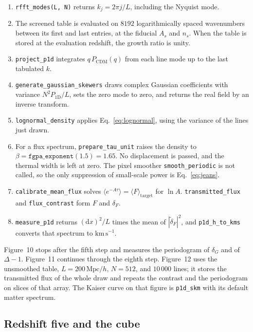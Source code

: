 \documentclass[11pt]{article}
\begin{document}
\begin{enumerate}
\item \texttt{rfft\_modes(L, N)} returns $k_j=2\pi j/L$, including the Nyquist mode.
\item The screened table is evaluated on $8192$ logarithmically spaced wavenumbers between its first and last entries, at the fiducial $A_s$ and $n_s$.
When the table is stored at the evaluation redshift, the growth ratio is unity.
\item \texttt{project\_p1d} integrates $q\,P_\mathrm{CDM}(q)$ from each line mode up to the last tabulated $k$.
\item \texttt{generate\_gaussian\_skewers} draws complex Gaussian coefficients with variance $N^{2}P_{1\mathrm{D}}/L$, sets the zero mode to zero, and returns the real field by an inverse transform.
\item \texttt{lognormal\_density} applies Eq.~\eqref{eq:lognormal}, using the variance of the lines just drawn.
\item For a flux spectrum, \texttt{prepare\_tau\_unit} raises the density to $\beta=\texttt{fgpa\_exponent}(1.5)=1.65$.
No displacement is passed, and the thermal width is left at zero.
The pixel smoother \texttt{smooth\_periodic} is not called, so the only suppression of small-scale power is Eq.~\eqref{eq:jeans}.
\item \texttt{calibrate\_mean\_flux} solves $\langle e^{-A\tau}\rangle=\langle F\rangle_\mathrm{target}$ for $\ln A$.
\texttt{transmitted\_flux} and \texttt{flux\_contrast} form $F$ and $\delta_F$.
\item \texttt{measure\_p1d} returns $(\mathrm{d}x)^{2}/L$ times the mean of $|\tilde\delta_F|^{2}$, and \texttt{p1d\_h\_to\_kms} converts that spectrum to $\mathrm{km\,s}^{-1}$.
\end{enumerate}

Figure~10 stops after the fifth step and measures the periodogram of $\delta_G$ and of $\Delta-1$.
Figure~11 continues through the eighth step.
Figure~12 uses the unsmoothed table, $L=200\,\mathrm{Mpc}/h$, $N=512$, and $10\,000$ lines; it stores the transmitted flux of the whole draw and repeats the contrast and the periodogram on slices of that array.
The Kaiser curve on that figure is \texttt{p1d\_skm} with its default matter spectrum.

\subsection{Redshift five and the cube}
\end{document}
